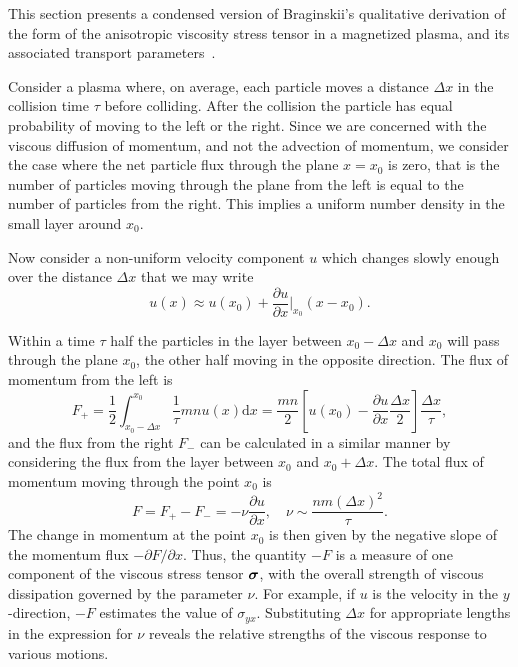 This section presents a condensed version of Braginskii's qualitative derivation of the form of the anisotropic viscosity stress tensor in a magnetized plasma, and its associated transport parameters~\cite{braginskiiTransportProcessesPlasma1965}. 

Consider a plasma where, on average, each particle moves a distance $\Delta x$ in the collision time $\tau$ before colliding. After the collision the particle has equal probability of moving to the left or the right. Since we are concerned with the viscous diffusion of momentum, and not the advection of momentum, we consider the case where the net particle flux through the plane $x=x_0$ is zero, that is the number of particles moving through the plane from the left is equal to the number of particles from the right. This implies a uniform number density in the small layer around $x_0$.

Now consider a non-uniform velocity component $u$ which changes slowly enough over the distance $\Delta x$ that we may write
\begin{equation}
  \label{eq:viscous_derivation_vy}
u (x) \approx u(x_0) + \frac{\partial u}{\partial x} \bigg| _{x_0} (x - x_0).
\end{equation}

Within a time $\tau$ half the particles in the layer between $x_0 - \Delta x$ and $x_0$ will pass through the plane $x_0$, the other half moving in the opposite direction. The flux of momentum from the left is
\begin{equation}
  \label{eq:momentum_flux_left}
F_{+} = \frac{1}{2} \int^{x_0}_{x_0 - \Delta x} \frac{1}{\tau} m n u(x) \text{d}x = \frac{mn}{2} \left[ u(x_0) - \frac{\partial u}{\partial x} \frac{\Delta x}{2} \right] \frac{\Delta x}{\tau},
\end{equation}
and the flux from the right $F_{-}$ can be calculated in a similar manner by considering the flux from the layer between $x_0$ and $x_0 + \Delta x$. The total flux of momentum moving through the point $x_0$ is
\begin{equation}
  \label{eq:total_momentum_flux}
  F = F_+ - F_- = - \nu \frac{\partial u}{\partial x}, \quad \nu \sim \frac{nm(\Delta x)^2}{\tau}.
\end{equation}
The change in momentum at the point $x_0$ is then given by the negative slope of the momentum flux $- \partial F/\partial x$. Thus, the quantity $-F$ is a measure of one component of the viscous stress tensor ${\bm \sigma}$, with the overall strength of viscous dissipation governed by the parameter $\nu$. For example, if $u$ is the velocity in the $y$-direction, $-F$ estimates the value of $\sigma_{yx}$. Substituting $\Delta x$ for appropriate lengths in the expression for $\nu$ reveals the relative strengths of the viscous response to various motions. 

